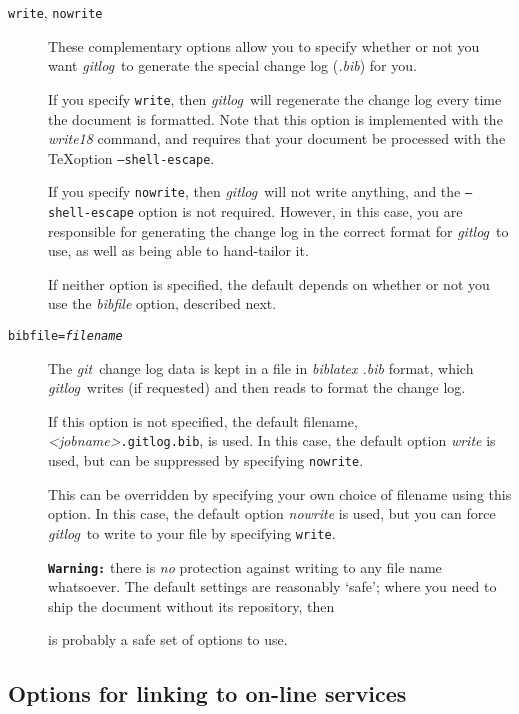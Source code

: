 \documentclass[a4paper,12pt,twoside,openany]{memoir}
\newcommand{\dark}[1]{\texttt\textbf{{#1}}}
\newcommand{\sfit}[1]{\textit{#1}}
\newcommand{\git}{\sfit{git}}
\newcommand{\tpname}{\sfit{gitlog}}
\begin{document}
\begin{description}

\item[\texttt{write}, \texttt{nowrite}]
These complementary options
allow you to specify whether or not you want 
\tpname\ to generate the special change log (\sfit{.bib}) 
for you.

If you specify \texttt{write}, then \tpname\ will regenerate the 
change log every time the document is formatted. 
Note that this option is implemented with the \sfit{\\write18} command,
and requires that your document be processed with the \TeX option 
\texttt{--shell-escape}.

If you specify \texttt{nowrite}, then \tpname\ will not write anything,
and the \texttt{--shell-escape} option is not required.
However, in this case, 
you are responsible for generating the change log 
in the correct format for \tpname\ to use, 
as well as being able to hand-tailor it.

If neither option is specified, the default depends on whether or not
you use the \sfit{bibfile} option, described next.  

\clearpage
\item[\texttt{bibfile=\textit{filename}}]
The \git\ change log data is kept in 
a file in \sfit{biblatex .bib} format, 
which \tpname\ writes (if requested) and then reads 
to format the change log.

If this option is not specified, the default filename,
\textit{<jobname>}\texttt{.gitlog.bib}, is used.
In this case, the default option \sfit{write} is used,
but can be suppressed by specifying \texttt{nowrite}.

This can be overridden by specifying your own choice
of filename using this option.
In this case, the default option \sfit{nowrite} is used,
but you can force \tpname\ to write to your file 
by specifying \texttt{write}.

\dark{Warning:} there is \emph{no} protection against writing
to any file name whatsoever. 
The default settings are reasonably `safe'; 
where you need to ship the document without its repository,
then  
\begin{quote}
{\ttfamily
[write,bibfile=\jobname.local.bib]
}
\end{quote}
is probably a safe set of options to use.

\end{description}

\subsection{Options for linking to on-line services}
\end{document}
